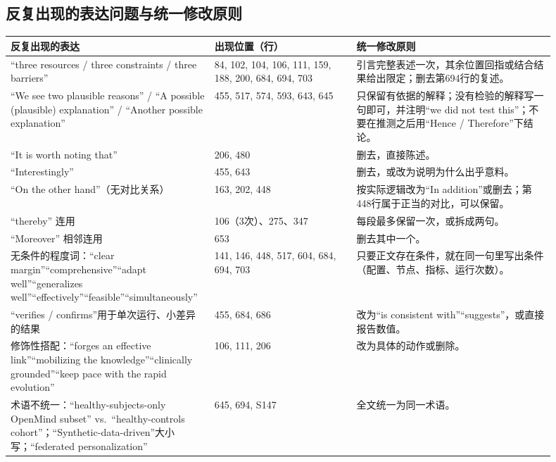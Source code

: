 \documentclass[11pt,a4paper]{ctexart}
\begin{document}
\subsection{反复出现的表达问题与统一修改原则}
\begin{center}
\small
\begin{longtable}{p{0.30\linewidth}p{0.25\linewidth}p{0.35\linewidth}}
\toprule
反复出现的表达 & 出现位置（行） & 统一修改原则 \\
\midrule
\endhead
“three resources / three constraints / three barriers” & 84, 102, 104, 106, 111, 159, 188, 200, 684, 694, 703 & 引言完整表述一次，其余位置回指或结合结果给出限定；删去第694行的复述。\\
“We see two plausible reasons” / “A possible (plausible) explanation” / “Another possible explanation” & 455, 517, 574, 593, 643, 645 & 只保留有依据的解释；没有检验的解释写一句即可，并注明“we did not test this”；不要在推测之后用“Hence / Therefore”下结论。\\
“It is worth noting that” & 206, 480 & 删去，直接陈述。\\
“Interestingly” & 455, 643 & 删去，或改为说明为什么出乎意料。\\
“On the other hand”（无对比关系） & 163, 202, 448 & 按实际逻辑改为“In addition”或删去；第448行属于正当的对比，可以保留。\\
“thereby” 连用 & 106（3次）、275、347 & 每段最多保留一次，或拆成两句。\\
“Moreover” 相邻连用 & 653 & 删去其中一个。\\
无条件的程度词：“clear margin”“comprehensive”“adapt well”“generalizes well”“effectively”“feasible”“simultaneously” & 141, 146, 448, 517, 604, 684, 694, 703 & 只要正文存在条件，就在同一句里写出条件（配置、节点、指标、运行次数）。\\
“verifies / confirms”用于单次运行、小差异的结果 & 455, 684, 686 & 改为“is consistent with”“suggests”，或直接报告数值。\\
修饰性搭配：“forges an effective link”“mobilizing the knowledge”“clinically grounded”“keep pace with the rapid evolution” & 106, 111, 206 & 改为具体的动作或删除。\\
术语不统一：“healthy-subjects-only OpenMind subset” vs.\ “healthy-controls cohort”；“Synthetic-data-driven”大小写；“federated personalization” & 645, 694, S147 & 全文统一为同一术语。\\
\bottomrule
\end{longtable}
\end{center}
\end{document}
